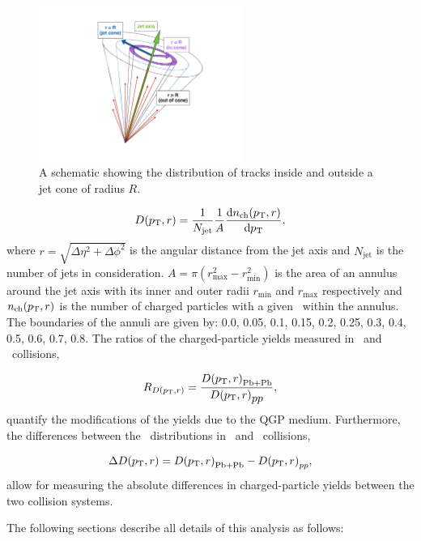 \begin{figure}[htbp]
\centering
\includegraphics[width=0.6\textwidth]{figures/main/general/cartoon_dptr}
\caption{A schematic showing the distribution of tracks inside and outside a jet cone of radius $R$.}
\label{fig:cartoon_dptr}
\end{figure}


\begin{align}
\mbox{$D( \mbox{$p_{\mathrm{T}}$}, r)$} = \frac{1}{N_{\mathrm{jet}}} \frac{1}{A} \frac{\mathrm{d} n_{\mathrm{ch}} (\mbox{$p_{\mathrm{T}}$}, r)}{\mathrm{d} \mbox{$p_{\mathrm{T}}$}},
\end{align}
where $r = \sqrt{\Delta \eta^2 + \Delta \phi^2}$ is the angular distance from the jet axis and $N_{\mathrm{jet}}$ is the number of jets in consideration.
$A = \pi (r_{\mathrm{max}}^2 - r_{\mathrm{min}}^2) $ is the area of an annulus around the jet axis with its inner and outer radii $r_{\mathrm{min}}$ and $r_{\mathrm{max}}$ respectively and $n_{\mathrm{ch}}(\mbox{$p_{\mathrm{T}}$}, r)$ is the number of charged particles with a given \pt\ within the annulus.
The boundaries of the annuli are given by: 0.0, 0.05, 0.1, 0.15, 0.2, 0.25, 0.3, 0.4, 0.5, 0.6, 0.7, 0.8.
The ratios of the charged-particle yields measured in \pbpb\ and \pp\ collisions,

\begin{align}
   \mbox{$R_{D( p_{\mathrm{T}}, r)}$} = \frac{\mbox{$D( \mbox{$p_{\mathrm{T}}$}, r)$}_\mathrm{Pb+Pb}}{\mbox{$D( \mbox{$p_{\mathrm{T}}$}, r)$}_{\mbox{$pp$}}},
\end{align}
quantify the modifications of the yields due to the QGP medium.
Furthermore, the differences between the \Dptr\ distributions in \pbpb\ and \pp\ collisions, 

\begin{align}
   \Delta \mbox{$D( \mbox{$p_{\mathrm{T}}$}, r)$} = \mbox{$D( \mbox{$p_{\mathrm{T}}$}, r)$}_\mathrm{Pb+Pb} - \mbox{$D( \mbox{$p_{\mathrm{T}}$}, r)$}_{pp},
\end{align}
allow for measuring the absolute differences in charged-particle yields between the two collision systems.

The following sections describe all details of this analysis as follows:

